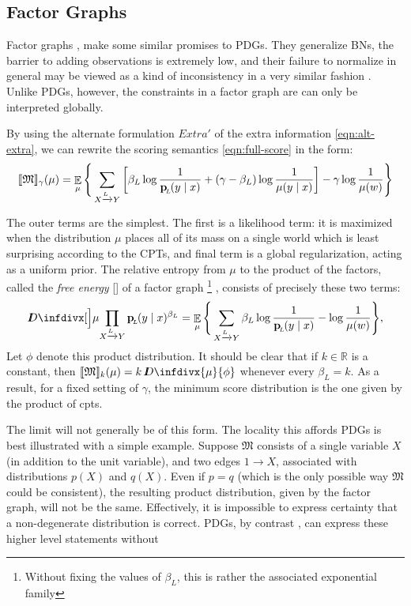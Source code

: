 \documentclass{article}
\theoremstyle{plain}
\theoremstyle{definition}
\theoremstyle{remark}
\newcommand{\thickD}{I\mkern-8muD}
\newcommand{\kldiv}{\thickD\infdivx}%
\DeclarePairedDelimiter{\bbr}{\llbracket}{\rrbracket}
\DeclareMathOperator*{\E}{\mathbb{E}} %
\newcommand{\todo}[1]{{\color{red}\ \!\Large\smash{\textbf{[}}{\normalsize\textsc{todo:} #1}\ \!\smash{\textbf{]}}}}
\newcommand\mat[1]{\mathbf{#1}}
\newcommand{\bp}[1][L]{\mat{p}_{\!_{#1}\!}}
\newcommand{\dg}[1]{\mathfrak{#1}}
\newcommand\extrsymb{\mathit{Extra}}
\newcommand{\ed}[3]{#2 \xrightarrow{\!\!\smash{#1}\vphantom{g}} #3}
\newcommand{\alle}[1][L]{_{ \ed {#1}XY}}
\numberwithin{equation}{section}
\begin{document}
	
	\subsection{Factor Graphs} \label{sec:factor-graphs}	
	Factor graphs \cite{koller2009probabilistic}, make some similar promises to PDGs. They generalize BNs, the barrier to adding observations is extremely low, and their failure to normalize in general may be viewed as a kind of inconsistency in a very similar fashion \cite{wainwright2008graphical}. Unlike PDGs, however, the constraints in a factor graph are can only be interpreted globally. 

	By using the alternate formulation $\extrsymb'$ of the extra information \eqref{eqn:alt-extra}, 
 	we can rewrite the scoring semantics \eqref{eqn:full-score} in the form:
	\begin{equation}
		\bbr{\dg M}_\gamma(\mu) = \E_\mu \Bigg\{   \sum_{ X \xrightarrow{\!\!L} Y  } \left[
			\beta_L \log \frac{1}{\bp(y\mid x)} + (\gamma - \beta_L ) \log \frac{1}{\mu(y \mid x)} \right] - \gamma \log \frac{1}{\mu(w)} \Bigg\} 
	\end{equation}

	The outer terms are the simplest. The first is a likelihood term: it is maximized when the distribution $\mu$ places all of its mass on a single world which is least surprising according to the CPTs, and final term is a global regularization, acting as a uniform prior. 
	The relative entropy from $\mu$ to the product of the factors, called the \emph{free energy} [] of a factor graph%
		\footnote{Without fixing the values of $\beta_L$, this is rather the associated exponential family}
	, consists of precisely these two terms:
	\[
		\kldiv[\Big]\mu{\prod\alle \bp(y \mid x) ^{\beta_L}}
		= \E_\mu \Bigg\{   \sum_{ X \xrightarrow{\!\!L} Y  }
			\beta_L \log \frac{1}{\bp(y\mid x)}  - \log \frac{1}{\mu(w)} \Bigg\},
	\]
	Let $\phi$ denote this product distribution. It should be clear that 
	if $k \in \mathbb R$ is a constant, then $\bbr{\dg M}_k(\mu) = k\,\kldiv{\mu}{\phi}$ whenever every $\beta_L = k$. As a result, for a fixed setting of $\gamma$, the minimum score distribution is the one given by the product of cpts.

	The limit will not generally be of this form. The locality this affords PDGs is best illustrated with a simple example. Suppose $\dg M$ consists of a single variable $X$ (in addition to the unit variable), and two edges $1 \to X$, associated with distributions $p(X)$ and $q(X)$. Even if $p = q$ (which is the only possible way $\dg M$ could be consistent), the resulting product distribution, given by the factor graph, will not be the same. Effectively, it is impossible to express certainty that a non-degenerate distribution is correct. PDGs, by contrast
	, can express these higher level statements without 
\end{document}
